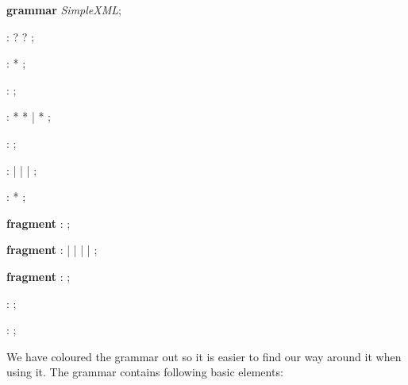 \begin{antlr}
	\textbf{grammar} \textit{SimpleXML};
	
	     :   ? ?  ;
	
	       :    *  ;
	
	      :   \literal{<!--}  \literal{-->} ;
	
	      :   \literal{<}  * \literal{>} * \literal{</}  \literal{>}
	             |   \literal{<}  * \literal{/>}
	             ;
	
	    :       ;
	
	      :   
	             |   
	             |   
	             |   
	             ;
	
	         :    * ;
	
	\textbf{fragment}
	        :   \regex{[0-9]} ;
	
	\textbf{fragment}
	     :   
	             |   \literal{-} | \literal{_} | 
	             |   
	             ;
	
	\textbf{fragment}
	:   \regex{[:a-zA-Z]} ;
	
	         :   \regex{~[<"]*} ;
	
	        :   \literal{<![CDATA[}  \literal{]]>} ;
\end{antlr}

\pagebreak

We have coloured the grammar out so it is easier to find our way around it when using it. The grammar contains following basic elements:

